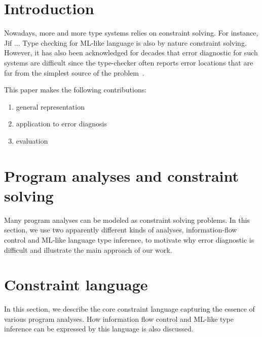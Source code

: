 \begin{abstract}
\end{abstract}

\section{Introduction}

Nowadays, more and more type systems relies on constraint solving. For
instance, Jif ... Type checking for ML-like language is also by nature
constraint solving. However, it has also been acknowledged for
decades that error diagnostic for such systems are difficult
since the type-checker often reports error locations that are far from the
simplest source of the problem~\cite{wand-errorfinding}.


This paper makes the following contributions:

\begin{enumerate}
\item
general representation

\item
application to error diagnosis

\item
evaluation
\end{enumerate}

\section{Program analyses and constraint solving}

Many program analyses can be modeled as constraint solving problems. In this
section, we use two apparently different kinds of analyses, information-flow
control and ML-like language type inference, to motivate why error diagnostic
is difficult and illustrate the main approach of our work.


\section{Constraint language}
\label{sec:language}

In this section, we describe the core constraint language capturing the essence
of various program analyses. How information flow control and ML-like type
inference can be expressed by this language is also discussed. 


